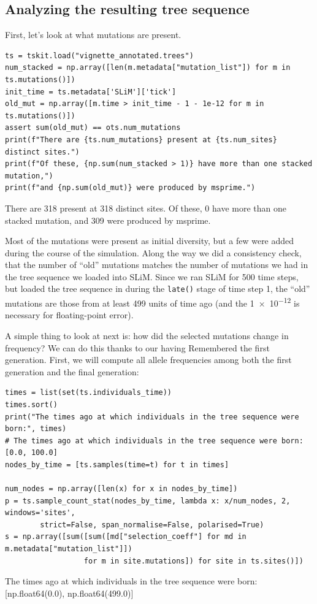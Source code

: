 \documentclass[12pt]{article}
\begin{document}
\subsection*{Analyzing the resulting tree sequence}

First, let’s look at what mutations are present.
\begin{lstlisting}
ts = tskit.load("vignette_annotated.trees")
num_stacked = np.array([len(m.metadata["mutation_list"]) for m in ts.mutations()])
init_time = ts.metadata['SLiM']['tick']
old_mut = np.array([m.time > init_time - 1 - 1e-12 for m in ts.mutations()])
assert sum(old_mut) == ots.num_mutations
print(f"There are {ts.num_mutations} present at {ts.num_sites} distinct sites.")
print(f"Of these, {np.sum(num_stacked > 1)} have more than one stacked mutation,")
print(f"and {np.sum(old_mut)} were produced by msprime.")
\end{lstlisting}
\begin{pycon}
There are 318 present at 318 distinct sites.
Of these, 0 have more than one stacked mutation,
and 309 were produced by msprime.
\end{pycon}

Most of the mutations were present as initial diversity,
but a few were added during the course of the simulation.
Along the way we did a consistency check,
that the number of “old” mutations matches the number of mutations we had in the tree sequence we loaded into SLiM.
Since we ran SLiM for 500 time steps,
but loaded the tree sequence in during the \verb|late()| stage of time step 1,
the “old” mutations are those from at least 499 units of time ago
(and the \num{1e-12} is necessary for floating-point error).

A simple thing to look at next is:
how did the selected mutations change in frequency?
We can do this thanks to our having Remembered the first generation.
First, we will compute all allele frequencies among both the first generation and the final generation:

\begin{listing}[H]
    \begin{verbatim}
times = list(set(ts.individuals_time))
times.sort()
print("The times ago at which individuals in the tree sequence were born:", times)
# The times ago at which individuals in the tree sequence were born: [0.0, 100.0]
nodes_by_time = [ts.samples(time=t) for t in times]

num_nodes = np.array([len(x) for x in nodes_by_time])
p = ts.sample_count_stat(nodes_by_time, lambda x: x/num_nodes, 2, windows='sites',
        strict=False, span_normalise=False, polarised=True)
s = np.array([sum([sum([md["selection_coeff"] for md in m.metadata["mutation_list"]])
                  for m in site.mutations]) for site in ts.sites()])
    \end{verbatim}
\end{listing}
\begin{pycon}
The times ago at which individuals in the tree sequence were born: [np.float64(0.0), np.float64(499.0)]
\end{pycon}
\end{document}
